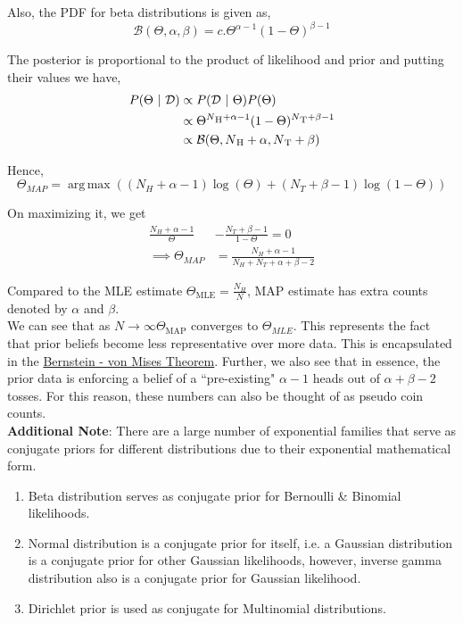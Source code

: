 \documentclass{report}
\newcommand{\D}{\mathcal{D}}
\newcommand{\Beta}{\mathcal{B}}
\DeclareMathOperator*{\argmax}{arg\,max}
\begin{document}
Also, the PDF for beta distributions is given as,
$$
  \Beta(\Theta, \alpha, \beta) = c.\Theta^{\alpha - 1}(1-\Theta)^{\beta - 1}
$$

The posterior is proportional to the product of likelihood and prior and putting their values we have,
\begin{align*}
  P(\Theta \ | \ \D) & \propto  P(\D \ | \ \Theta)  P(\Theta)                                                      \\
                     & \propto \Theta^{N\textsubscript{H} + \alpha - 1}(1-\Theta)^{N\textsubscript{T} + \beta - 1} \\
                     & \propto \Beta(\Theta, N\textsubscript{H} + \alpha, N\textsubscript{T} + \beta)
\end{align*}

Hence,
$$
  \Theta_{MAP} = \argmax ((N_H+\alpha-1)\log(\Theta) + (N_T+\beta-1)\log(1-\Theta))
$$

On maximizing it, we get
\begin{align*}
  \frac{N_H+\alpha-1}{\Theta} & - \frac{N_T+\beta-1}{1-\Theta} = 0            \\
  \implies \Theta_{MAP}       & = \frac{N_H+\alpha-1}{N_H+N_T+\alpha+\beta-2}
\end{align*}

Compared to the MLE estimate $\Theta_{\text{MLE}} = \frac{N_H}{N}$, MAP estimate has extra counts denoted by $\alpha$ and $\beta$. \\

We can see that as $N \to \infty \Theta_{\text{MAP}}$ converges to $\Theta_{MLE}$. This represents the fact that prior beliefs become less representative over more data. This is encapsulated in the \href{https://en.wikipedia.org/wiki/Bernstein\%E2\%80\%93von\_Mises\_theorem}{Bernstein - von Mises Theorem}. Further, we also see that in essence, the prior data is enforcing a belief of a ``pre-existing" $\alpha - 1$ heads out of $\alpha + \beta - 2$ tosses. For this reason, these numbers can also be thought of as pseudo coin counts. \\

\textbf{Additional Note}: There are a large number of exponential families that serve as conjugate priors for different distributions due to their exponential mathematical form.
\begin{enumerate}
  \item Beta distribution serves as conjugate prior for Bernoulli \& Binomial likelihoods.
  \item Normal distribution is a conjugate prior for itself, i.e. a Gaussian distribution is a conjugate prior for other Gaussian likelihoods, however, inverse gamma distribution also is a conjugate prior for Gaussian likelihood.
  \item Dirichlet prior is used as conjugate for Multinomial distributions.
\end{enumerate}
\end{document}
